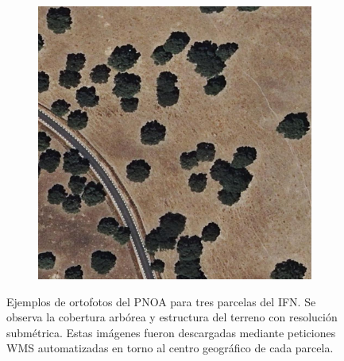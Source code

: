 \begin{figure}[H]
\begin{subfigure}[b]{0.31\textwidth}
        \label{fig:orto2}
    \end{subfigure}
    \hfill
    \begin{subfigure}[b]{0.31\textwidth}
        \includegraphics[width=\linewidth]{figuras/37_688_2002.0.jpg}
        \label{fig:orto3}
    \end{subfigure}
    
    \caption{\small Ejemplos de ortofotos del PNOA para tres parcelas del IFN. Se observa la cobertura arbórea y estructura del terreno con resolución submétrica. Estas imágenes fueron descargadas mediante peticiones WMS automatizadas en torno al centro geográfico de cada parcela.}
    \label{fig:ortofotos_ejemplo}
\end{figure}

